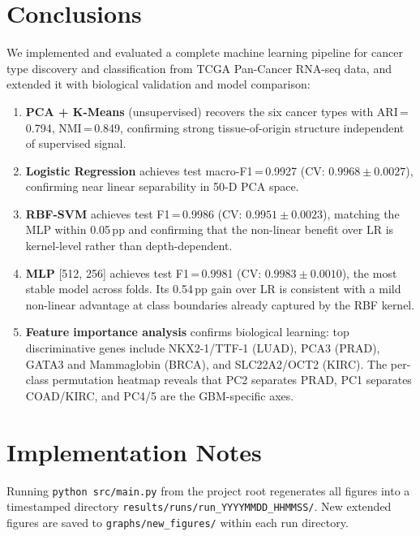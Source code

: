 \documentclass[11pt,letterpaper]{article}
\begin{document}
\section{Conclusions}
\label{sec:conclusions}

We implemented and evaluated a complete machine learning pipeline for cancer
type discovery and classification from TCGA Pan-Cancer RNA-seq data, and
extended it with biological validation and model comparison:

\begin{enumerate}[leftmargin=2em,itemsep=2pt]
  \item \textbf{PCA + K-Means} (unsupervised) recovers the six cancer types
        with ARI\,=\,0.794, NMI\,=\,0.849, confirming strong tissue-of-origin
        structure independent of supervised signal.
  \item \textbf{Logistic Regression} achieves test macro-F1\,=\,0.9927
        (CV: $0.9968 \pm 0.0027$), confirming near linear separability in
        50-D PCA space.
  \item \textbf{RBF-SVM} achieves test F1\,=\,0.9986 (CV: $0.9951 \pm 0.0023$),
        matching the MLP within 0.05\,pp and confirming that the non-linear
        benefit over LR is kernel-level rather than depth-dependent.
  \item \textbf{MLP} [512, 256] achieves test F1\,=\,0.9981 (CV:
        $0.9983 \pm 0.0010$), the most stable model across folds.  Its 0.54\,pp
        gain over LR is consistent with a mild non-linear advantage at class
        boundaries already captured by the RBF kernel.
  \item \textbf{Feature importance analysis} confirms biological learning: top
        discriminative genes include NKX2-1/TTF-1 (LUAD), PCA3 (PRAD), GATA3
        and Mammaglobin (BRCA), and SLC22A2/OCT2 (KIRC).  The per-class
        permutation heatmap reveals that PC2 separates PRAD, PC1 separates
        COAD/KIRC, and PC4/5 are the GBM-specific axes.
\end{enumerate}

\section*{Implementation Notes}

Running \texttt{python src/main.py} from the project root regenerates all
figures into a timestamped directory
\texttt{results/runs/run\_YYYYMMDD\_HHMMSS/}.  New extended figures are saved
to \texttt{graphs/new\_figures/} within each run directory.
\end{document}
